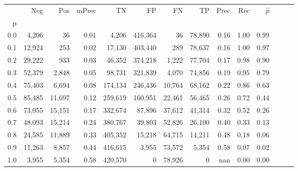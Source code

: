 \begin{tabular}{rrrrrrrrrrrrrr}
\toprule
{} &     Neg &     Pos & mPrec &       TN &       FP &      FN &      TP &  Prec &   Rec & $\hat{p}$ \\
p   &         &         &       &          &          &         &         &       &       &           \\
\midrule
0.0 &   4,206 &      36 &  0.01 &    4,206 &  416,364 &      36 &  78,890 &  0.16 &  1.00 &      0.99 \\
0.1 &  12,924 &     253 &  0.02 &   17,130 &  403,440 &     289 &  78,637 &  0.16 &  1.00 &      0.97 \\
0.2 &  29,222 &     933 &  0.03 &   46,352 &  374,218 &   1,222 &  77,704 &  0.17 &  0.98 &      0.90 \\
0.3 &  52,379 &   2,848 &  0.05 &   98,731 &  321,839 &   4,070 &  74,856 &  0.19 &  0.95 &      0.79 \\
0.4 &  75,403 &   6,694 &  0.08 &  174,134 &  246,436 &  10,764 &  68,162 &  0.22 &  0.86 &      0.63 \\
0.5 &  85,485 &  11,697 &  0.12 &  259,619 &  160,951 &  22,461 &  56,465 &  0.26 &  0.72 &      0.44 \\
0.6 &  73,055 &  15,151 &  0.17 &  332,674 &   87,896 &  37,612 &  41,314 &  0.32 &  0.52 &      0.26 \\
0.7 &  48,093 &  15,214 &  0.24 &  380,767 &   39,803 &  52,826 &  26,100 &  0.40 &  0.33 &      0.13 \\
0.8 &  24,585 &  11,889 &  0.33 &  405,352 &   15,218 &  64,715 &  14,211 &  0.48 &  0.18 &      0.06 \\
0.9 &  11,263 &   8,857 &  0.44 &  416,615 &    3,955 &  73,572 &   5,354 &  0.58 &  0.07 &      0.02 \\
1.0 &   3,955 &   5,354 &  0.58 &  420,570 &        0 &  78,926 &       0 &   nan &  0.00 &      0.00 \\
\bottomrule
\end{tabular}
